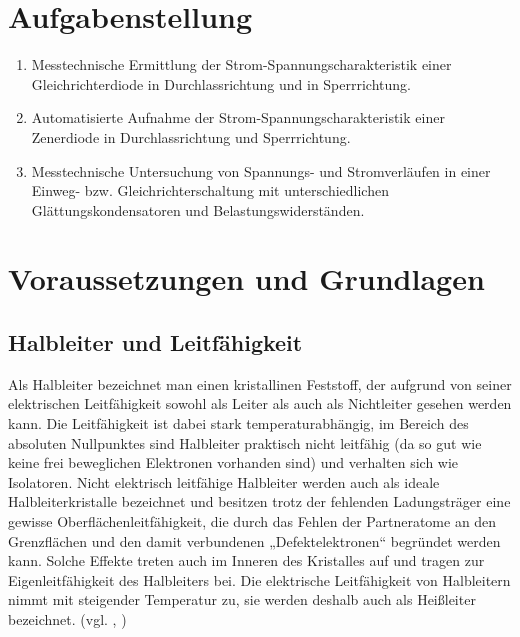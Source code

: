 \documentclass{article}
\begin{document}
\parindent0cm




\pagestyle{fancy}

\tableofcontents
\newpage
\section{Aufgabenstellung}



\begin{enumerate}
\item Messtechnische Ermittlung der Strom-Spannungscharakteristik einer Gleichrichterdiode in Durchlassrichtung und in Sperrrichtung.
\item Automatisierte Aufnahme der Strom-Spannungscharakteristik einer Zenerdiode in Durchlassrichtung und Sperrrichtung.
\item Messtechnische Untersuchung von Spannungs- und Stromverläufen in einer Einweg- bzw. Gleichrichterschaltung mit unterschiedlichen Glättungskondensatoren und Belastungswiderständen.
\end{enumerate}



\section{Voraussetzungen und Grundlagen}

\subsection{Halbleiter und Leitfähigkeit}

Als Halbleiter bezeichnet man einen kristallinen Feststoff, der aufgrund von seiner elektrischen Leitfähigkeit sowohl als Leiter als auch als Nichtleiter gesehen werden kann. Die Leitfähigkeit ist dabei stark temperaturabhängig, im Bereich des absoluten Nullpunktes sind Halbleiter praktisch nicht leitfähig (da so gut wie keine frei beweglichen Elektronen vorhanden sind) und verhalten sich wie Isolatoren. Nicht elektrisch leitfähige Halbleiter werden auch als ideale Halbleiterkristalle bezeichnet und besitzen trotz der fehlenden Ladungsträger eine gewisse Oberflächenleitfähigkeit, die durch das Fehlen der Partneratome an den Grenzflächen und den damit verbundenen „Defektelektronen“ begründet werden kann. Solche Effekte treten auch im Inneren des Kristalles auf und tragen zur Eigenleitfähigkeit des Halbleiters bei.
Die elektrische Leitfähigkeit von Halbleitern nimmt mit steigender Temperatur zu, sie werden deshalb auch als Heißleiter bezeichnet. (vgl. \cite{moodle}, \cite{halbleiter})
\end{document}
